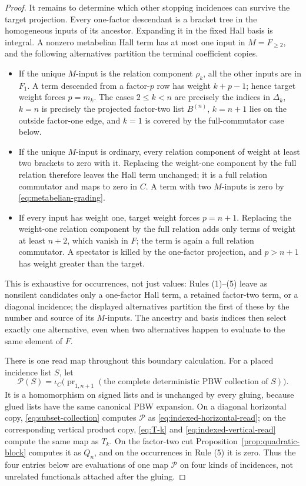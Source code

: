 \documentclass[11pt]{amsart}
\theoremstyle{remark}
\newcommand{\pr}{\operatorname{pr}}
\begin{document}
\begin{proof}
	It remains to determine which other stopping incidences can survive the
	target projection.  Every one-factor descendant is a bracket tree in
	the homogeneous inputs of its ancestor.  Expanding it in the fixed Hall
	basis is integral.  A nonzero metabelian Hall term has at most one input
	in $M=F_{\geq2}$, and the following alternatives partition the terminal
	coefficient copies.
	\begin{itemize}
	\item If the unique $M$-input is the relation component $\rho_k$, all
	the other inputs are in $F_1$.  A term descended from a factor-$p$ row
	has weight $k+p-1$; hence target weight forces $p=m_k$.  The cases
	$2\leq k<n$ are precisely the indices in $\Delta_k$, $k=n$ is precisely
	the projected factor-two list $B^{(n)}$, $k=n+1$ lies on the outside
	factor-one edge,
	and $k=1$ is covered by the full-commutator case below.
	\item If the unique $M$-input is ordinary, every relation component of
	weight at least two brackets to zero with it.  Replacing the weight-one
	component by the full relation therefore leaves the Hall term unchanged;
	it is a full relation commutator and maps to zero in $C$.  A term with
	two $M$-inputs is zero by \eqref{eq:metabelian-grading}.
	\item If every input has weight one, target weight forces $p=n+1$.
	Replacing the weight-one relation component by the full relation adds
	only terms of weight at least $n+2$, which vanish in $F$; the term is
	again a full relation commutator.  A spectator is killed by the
	one-factor projection, and $p>n+1$ has weight greater than the target.
	\end{itemize}
	This is exhaustive for occurrences, not just values: Rules (1)--(5)
	leave as nonsilent candidates only a one-factor Hall term, a retained factor-two term, or a
	diagonal incidence; the displayed alternatives partition the first of
	these by the number and source of its $M$-inputs.  The ancestry and basis
	indices then select exactly one alternative, even when two alternatives
	happen to evaluate to the same element of $F$.

	There is one read map throughout this boundary calculation.  For a
	placed incidence list $S$, let
	\[
	 \mathcal P(S)=\iota_C\bigl(\pr_{1,n+1}
	        (\text{the complete deterministic PBW collection of }S)\bigr).
	\]
	It is a homomorphism on signed lists and is unchanged by every gluing,
	because glued lists have the same canonical PBW expansion.  On a
	diagonal horizontal copy, \eqref{eq:subset-collection} computes
	$\mathcal P$ as \eqref{eq:indexed-horizontal-read}; on the corresponding
	vertical product copy, \eqref{eq:T-k} and
	\eqref{eq:indexed-vertical-read} compute the same map as $T_k$.  On the
	factor-two cut Proposition~\ref{prop:quadratic-block} computes it as
	$Q_n$, and on the occurrences in Rule (5) it is zero.  Thus the four
	entries below are evaluations of one map $\mathcal P$ on four kinds of
	incidences, not unrelated functionals attached after the gluing.


\end{proof}
\end{document}
